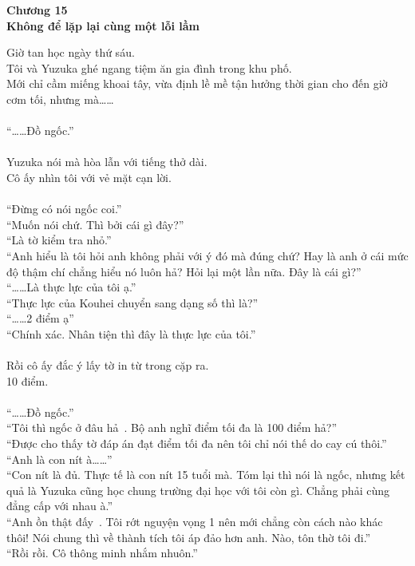 \documentclass[12pt,a4paper, twosides]{book}
\begin{document}
    \begin{center}
    \textbf{\large Chương 15 \\ Không để lặp lại cùng một lỗi lầm}
    \end{center}
    \noindent
Giờ tan học ngày thứ sáu.\\
Tôi và Yuzuka ghé ngang tiệm ăn gia đình trong khu phố.\\
Mới chỉ cầm miếng khoai tây, vừa định lề mề tận hưởng thời gian cho đến giờ cơm tối, nhưng mà……\\
\\
“……Đồ ngốc.”\\
\\
Yuzuka nói mà hòa lẫn với tiếng thở dài.\\
Cô ấy nhìn tôi với vẻ mặt cạn lời.\\
\\
“Đừng có nói ngốc coi.”\\
“Muốn nói chứ. Thì bởi cái gì đây?”\\
“Là tờ kiểm tra nhỏ.”\\
“Anh hiểu là tôi hỏi anh không phải với ý đó mà đúng chứ? Hay là anh ở cái mức độ thậm chí chẳng hiểu nó luôn hả? Hỏi lại một lần nữa. Đây là cái gì?”\\
“……Là thực lực của tôi ạ.”\\
“Thực lực của Kouhei chuyển sang dạng số thì là?”\\
“……2 điểm ạ”\\
“Chính xác. Nhân tiện thì đây là thực lực của tôi.”\\
\\
Rồi cô ấy đắc ý lấy tờ in từ trong cặp ra.\\
10 điểm.\\
\\
“……Đồ ngốc.”\\
“Tôi thì ngốc ở đâu hả~. Bộ anh nghĩ điểm tối đa là 100 điểm hả?”\\
“Được cho thấy tờ đáp án đạt điểm tối đa nên tôi chỉ nói thế do cay cú thôi.”\\
“Anh là con nít à……”\\
“Con nít là đủ. Thực tế là con nít 15 tuổi mà. Tóm lại thì nói là ngốc, nhưng kết quả là Yuzuka cũng học chung trường đại học với tôi còn gì. Chẳng phải cùng đẳng cấp với nhau à.”\\
“Anh ồn thật đấy~. Tôi rớt nguyện vọng 1 nên mới chẳng còn cách nào khác thôi! Nói chung thì về thành tích tôi áp đảo hơn anh. Nào, tôn thờ tôi đi.”\\
“Rồi rồi. Cô thông minh nhắm nhuôn.”\\
\end{document}
